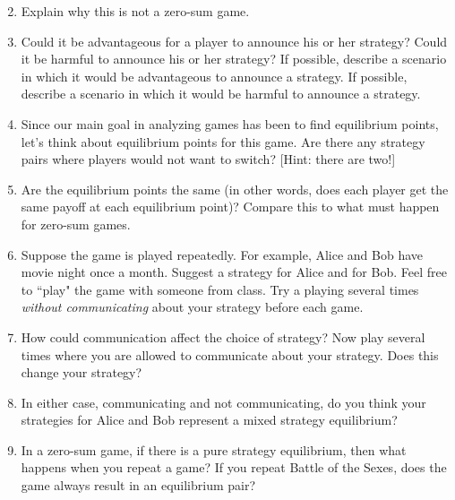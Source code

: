 \begin{enumerate}
\setcounter{enumi}{1}

\item Explain why this is not a zero-sum game. 

\item Could it be advantageous for a player to announce his or her strategy? Could it be harmful to announce his or her strategy? If possible, describe a scenario  in which it would be advantageous to announce a strategy. If possible, describe a scenario  in which it would be harmful to announce a strategy.

\item Since our main goal in analyzing games has been to find equilibrium points,  let's think about equilibrium points for this game. Are there any strategy pairs where players would not want to switch? [Hint: there are two!] 

\item Are the equilibrium points the same (in other words, does each player get the same payoff at each equilibrium point)? Compare this to what must happen for zero-sum games.

\item Suppose the game is played repeatedly. For example, Alice and Bob have movie night once a month. Suggest a strategy for Alice and for Bob.  Feel free to ``play" the game with someone from class. Try a playing several times {\it without communicating} about your strategy before each game.

\item How could communication affect the choice of strategy? Now play several times where you are allowed to communicate about your strategy. Does this change your strategy? 
\item In either case, communicating and not communicating, do you think your strategies for Alice and Bob represent a mixed strategy equilibrium?

\item In a zero-sum game, if there is a pure strategy equilibrium, then what happens when you repeat a game? If you repeat Battle of the Sexes, does the game always result in an equilibrium pair? 
\end{enumerate}

